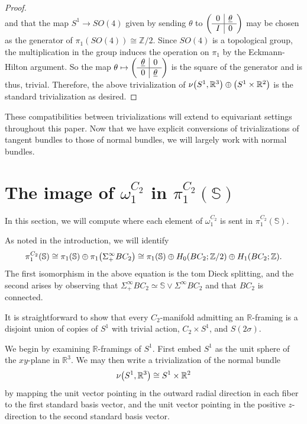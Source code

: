 \documentclass[11pt]{amsart}
\newcommand{\R}{\mathbb R}
\newcommand{\Z}{\mathbb{Z}}
\newcommand{\Sph}{\mathbb{S}}
\theoremstyle{plain}   %
\theoremstyle{definition}
\theoremstyle{remark}
\numberwithin{equation}{section}
\let\originalleft\left
\let\originalright\right
\renewcommand{\left}{\mathopen{}\mathclose\bgroup\originalleft}
\renewcommand{\right}{\aftergroup\egroup\originalright}
\begin{document}
\begin{proof}
\[\]
and that the map $S^1\to SO(4)$ given by sending $\theta$ to $\left(\begin{array}{c|c} 0&\underline{\theta} \\ \hline I&0 \end{array} \right)$ may be chosen as the generator of $\pi_1(SO(4))\cong \Z/2$. Since $SO(4)$ is a topological group, the multiplication in the group induces the operation on $\pi_1$ by the Eckmann-Hilton argument. So the map $\theta\mapsto \left(\begin{array}{c|c} \underline{\theta} & 0\\ \hline 0 & \underline{\theta} \end{array} \right)$ is the square of the generator and is thus, trivial. Therefore, the above trivialization of $\nu\left(S^1,\R^3\right) \oplus \left(S^1\times\R^2\right)$ is the standard trivialization as desired. 
\end{proof}

These compatibilities between trivializations will extend to equivariant settings throughout this paper. Now that we have explicit conversions of trivializations of tangent bundles to those of normal bundles, we will largely work with normal bundles. 

\section{The image of \texorpdfstring{$\omega_1^{C_2}$}{TEXT} in \texorpdfstring{$\pi_1^{C_2}(\Sph)$}{TEXT}}

In this section, we will compute where each element of $\omega_1^{C_2}$ is sent in $\pi_1^{C_2}(\Sph)$. 

As noted in the introduction, we will identify
\[
\pi_1^{C_2}\left(\Sph\right) \cong \pi_1\left(\Sph\right)\oplus \pi_1\left(\Sigma_+^\infty BC_2\right)\cong \pi_1\left(\Sph\right)\oplus H_0\left(BC_2;\Z/2\right)\oplus H_1\left(BC_2;\Z\right).
\]
The first isomorphism in the above equation is the tom Dieck splitting, and the second arises by observing that $\Sigma_+^\infty BC_2 \simeq \Sph\vee \Sigma^\infty BC_2$ and that $BC_2$ is connected. 

It is straightforward to show that every $C_2$-manifold admitting an $\R$-framing is a disjoint union of copies of $S^1$ with trivial action, $C_2\times S^1$, and $S(2\sigma)$.  

We begin by examining $\R$-framings of $S^1$. First embed $S^1$ as the unit sphere of the $xy$-plane in $\R^3$. We may then write a trivialization of the normal bundle 
\[
\nu\left(S^1,\R^3\right)\cong S^1\times\R^2
\]
by mapping the unit vector pointing in the outward radial direction in each fiber to the first standard basis vector, and the unit vector pointing in the positive $z$-direction to the second standard basis vector.
\end{document}
